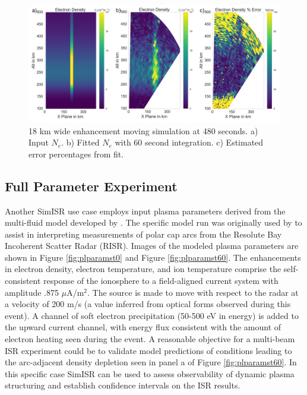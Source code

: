 \documentclass[draft,ras]{agutex}
\begin{document}
\begin{article}
\begin{figure}[!t]
\centering
\includegraphics[width=6in]{moving18kminouterr}
\caption{18 km wide enhancement moving simulation at 480 seconds. a) Input $N_e$.  b) Fitted $N_e$ with 60 second integration. c) Estimated error percentages from fit.}
\label{fig:moving18all}
\end{figure}

\subsection{Full Parameter Experiment}
\label{sec:fullparam}
Another SimISR use case employs input plasma parameters derived from the multi-fluid model developed by \citet{semeter:plasmatransport2012}. The specific model run was originally used by \citet{Perry:2015jf} to assist in interpreting measurements of polar cap arcs from the Resolute Bay Incoherent Scatter Radar (RISR). Images of the modeled plasma parameters are shown in Figure \ref{fig:plparamst0} and Figure \ref{fig:plparamst60}. The enhancements in electron density, electron temperature, and ion temperature comprise the self-consistent response of the ionosphere to a field-aligned current system with amplitude .875 $\mu$A/m$^2$.  The source is made to move with respect to the radar at a velocity of 200 m/s (a  value inferred from optical forms observed during this event).  A channel of soft electron precipitation (50-500 eV in energy) is added to the upward current channel, with energy flux consistent with the amount of electron heating seen during the event.  A reasonable objective for a multi-beam ISR experiment could be to validate model predictions of conditions leading to the arc-adjacent density depletion seen in panel a of Figure \ref{fig:plparamst60}.  In this specific case SimISR can be used to assess observability of dynamic plasma structuring and establish confidence intervals on the ISR results. 


\end{article}
\end{document}
